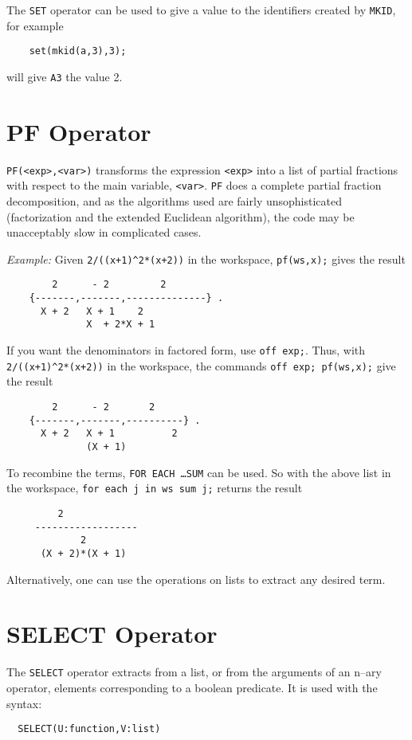 The {\tt SET} operator can be used to give a value to the
identifiers created by {\tt MKID}, for example
\begin{verbatim}
	set(mkid(a,3),3);
\end{verbatim}
will give {\tt A3} the value 2.

\section{PF Operator}

{\tt PF(<exp>,<var>)} transforms the expression {\tt <exp>} into a list of
partial fractions with respect to the main variable, {\tt <var>}.  {\tt PF}
does a complete partial fraction decomposition, and as the algorithms used
are fairly unsophisticated (factorization and the extended Euclidean
algorithm), the code may be unacceptably slow in complicated cases.

{\it Example:}
Given {\tt 2/((x+1)\verb|^|2*(x+2))} in the workspace,
{\tt pf(ws,x);} gives the result
\begin{verbatim}
	    2      - 2         2
	{-------,-------,--------------} .
	  X + 2   X + 1    2
			  X  + 2*X + 1
\end{verbatim}

If you want the denominators in factored form, use {\tt off exp;}.
Thus, with {\tt 2/((x+1)\verb|^|2*(x+2))} in the workspace, the commands
{\tt off exp; pf(ws,x);} give the result
\begin{verbatim}
	    2      - 2       2
	{-------,-------,----------} .
	  X + 2   X + 1          2
			  (X + 1)
\end{verbatim}

To recombine the terms, {\tt FOR EACH \ldots SUM} can be used.  So with
the above list in the workspace, {\tt for each j in ws sum j;} returns the
result
\begin{verbatim}
	     2
     ------------------
		     2
      (X + 2)*(X + 1)
\end{verbatim}

Alternatively, one can use the operations on lists to extract any desired
term.

\section{SELECT Operator}

The {\tt SELECT} operator extracts from a list,
or from the arguments of an n--ary operator, elements corresponding
to a boolean predicate. It is used with the syntax:
\begin{verbatim}
  SELECT(U:function,V:list)
\end{verbatim}

